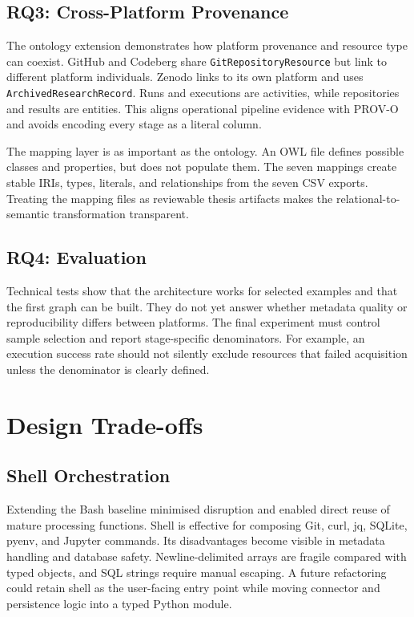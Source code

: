 \subsection{RQ3: Cross-Platform Provenance}

The ontology extension demonstrates how platform provenance and resource type can coexist. GitHub and Codeberg share \texttt{GitRepositoryResource} but link to different platform individuals. Zenodo links to its own platform and uses \texttt{ArchivedResearchRecord}. Runs and executions are activities, while repositories and results are entities. This aligns operational pipeline evidence with PROV-O and avoids encoding every stage as a literal column.

The mapping layer is as important as the ontology. An OWL file defines possible classes and properties, but does not populate them. The seven mappings create stable IRIs, types, literals, and relationships from the seven CSV exports. Treating the mapping files as reviewable thesis artifacts makes the relational-to-semantic transformation transparent.

\subsection{RQ4: Evaluation}

Technical tests show that the architecture works for selected examples and that the first graph can be built. They do not yet answer whether metadata quality or reproducibility differs between platforms. The final experiment must control sample selection and report stage-specific denominators. For example, an execution success rate should not silently exclude resources that failed acquisition unless the denominator is clearly defined.

\section{Design Trade-offs}

\subsection{Shell Orchestration}

Extending the Bash baseline minimised disruption and enabled direct reuse of mature processing functions. Shell is effective for composing Git, curl, jq, SQLite, pyenv, and Jupyter commands. Its disadvantages become visible in metadata handling and database safety. Newline-delimited arrays are fragile compared with typed objects, and SQL strings require manual escaping. A future refactoring could retain shell as the user-facing entry point while moving connector and persistence logic into a typed Python module.

